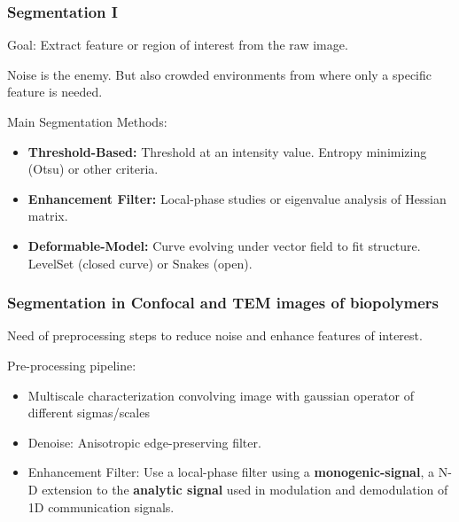 \documentclass[9pt]{beamer}
\begin{document}
\begin{frame}[t]
  \frametitle{Segmentation I}
    \alert{Goal:} Extract feature or region of interest from the raw image.

     Noise is the enemy.
     But also crowded environments from where only a specific feature is needed.

     \vspace{0.8cm}
     \begin{exampleblock}{Main Segmentation Methods:}
       \begin{itemize}
         \item \textbf{Threshold-Based:} Threshold at an intensity value. Entropy minimizing (Otsu) or other criteria.
         \item \textbf{Enhancement Filter:} Local-phase studies or eigenvalue analysis of Hessian matrix.
         \item \textbf{Deformable-Model:} Curve evolving under vector field to fit structure. LevelSet (closed curve) or Snakes (open).
       \end{itemize}
     \end{exampleblock}
\end{frame}

\begin{frame}[t]
  \frametitle{Segmentation in Confocal and TEM images of biopolymers}
     Need of preprocessing steps to reduce noise and enhance features of interest.
     \begin{exampleblock}{Pre-processing pipeline:}
     \begin{itemize}
       \item Multiscale characterization convolving image with gaussian operator of different sigmas/scales
       \item Denoise: Anisotropic edge-preserving filter.
       \item Enhancement Filter: Use a local-phase filter using a \textbf{monogenic-signal}, a N-D extension to the \textbf{analytic signal} used in modulation and demodulation of 1D communication signals.
     \end{itemize}
     \end{exampleblock}
\end{frame}
\end{document}
